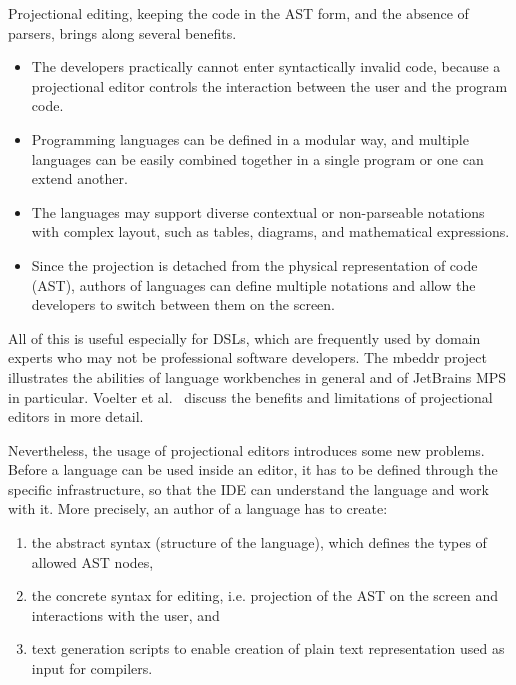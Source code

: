 Projectional editing, keeping the code in the AST form, and the absence of parsers, brings along several benefits.
\begin{itemize}
	\item The developers practically cannot enter syntactically invalid code, because a projectional editor controls the interaction between the user and the program code.
	\item Programming languages can be defined in a modular way, and multiple languages can be easily combined together in a single program or one can extend another.
	\item The languages may support diverse contextual or non-parseable notations with complex layout, such as tables, diagrams, and mathematical expressions.
	\item Since the projection is detached from the physical representation of code (AST), authors of languages can define multiple notations and allow the developers to switch between them on the screen.
\end{itemize}
All of this is useful especially for DSLs, which are frequently used by domain experts who may not be professional software developers.
The mbeddr project~\cite{ref:MBEDDR} illustrates the abilities of language workbenches in general and of JetBrains MPS in particular.
Voelter et al.~\cite{ref:VSB14} discuss the benefits and limitations of projectional editors in more detail.

Nevertheless, the usage of projectional editors introduces some new problems.
Before a language can be used inside an editor, it has to be defined through the specific infrastructure, so that the IDE can understand the language and work with it.
More precisely, an author of a language has to create:
\begin{enumerate}
	\item the abstract syntax (structure of the language), which defines the types of allowed AST nodes,
	\item the concrete syntax for editing, i.e. projection of the AST on the screen and interactions with the user, and
	\item text generation scripts to enable creation of plain text representation used as input for compilers.
\end{enumerate}	


